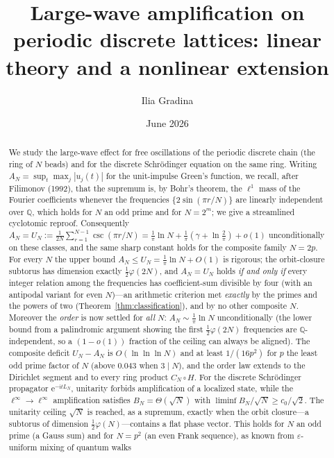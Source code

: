 \documentclass[11pt,reqno]{amsart}
\theoremstyle{plain}
\theoremstyle{definition}
\newcommand{\Q}{\mathbb{Q}}
\newcommand{\LN}{L_N}
\newcommand{\eu}{\mathrm{e}}
\begin{document}
\title[Large-wave amplification on discrete lattices]{Large-wave amplification on periodic discrete lattices: linear theory and a nonlinear extension}
\author{Ilia Gradina}
\date{June 2026}

\begin{abstract}
We study the large-wave effect for free oscillations of the periodic discrete chain
(the ring of $N$ beads) and for the discrete Schr\"odinger equation on the same ring.
Writing $A_N=\sup_{t}\max_j|u_j(t)|$ for the unit-impulse Green's function, we recall, after
Filimonov (1992), that the supremum is, by Bohr's theorem, the $\ell^1$ mass of the Fourier coefficients
whenever the frequencies $\{2\sin(\pi r/N)\}$ are linearly independent over $\Q$, which holds for $N$ an odd
prime and for $N=2^m$; we give a streamlined cyclotomic reproof. Consequently
$A_N=U_N:=\tfrac1{2N}\sum_{r=1}^{N-1}\csc(\pi r/N)=\tfrac1\pi\ln N+\tfrac1\pi(\gamma+\ln\tfrac2\pi)+o(1)$
unconditionally on these classes, and the same sharp constant holds for the composite family $N=2p$.
For every $N$ the upper bound $A_N\le U_N=\tfrac1\pi\ln N+O(1)$ is rigorous; the orbit-closure subtorus
has dimension exactly $\tfrac12\varphi(2N)$, and $A_N=U_N$ holds \emph{if and only if} every integer
relation among the frequencies has coefficient-sum divisible by four (with an antipodal variant for even
$N$)---an arithmetic criterion met \emph{exactly} by the primes and the powers of two
(Theorem~\ref{thm:classification}), and by no other composite $N$. Moreover the \emph{order} is now settled for
\emph{all} $N$: $A_N\sim\tfrac1\pi\ln N$ unconditionally (the lower bound from a palindromic argument
showing the first $\tfrac12\varphi(2N)$ frequencies are $\Q$-independent, so a $(1-o(1))$ fraction of the
ceiling can always be aligned). The composite deficit $U_N-A_N$ is $O(\ln\ln\ln N)$ and at least $1/(16p^2)$ for
$p$ the least odd prime factor of $N$ (above $0.043$ when $3\mid N$), and the order law extends to the Dirichlet segment
and to every ring product $C_N\,\square\,H$. For the discrete Schr\"odinger propagator
$\eu^{-\mathrm{i}t\LN}$, unitarity forbids amplification of a localized state, while the
$\ell^\infty\!\to\!\ell^\infty$ amplification satisfies $B_N=\Theta(\sqrt N)$ with $\liminf B_N/\sqrt N\ge
c_0/\sqrt2$. The unitarity ceiling $\sqrt N$ is reached, as a supremum, exactly when the orbit closure---a
subtorus of dimension $\tfrac12\varphi(N)$---contains a flat phase vector. This holds for $N$ an odd prime
(a Gauss sum) and for $N=p^2$ (an even Frank sequence), as known from $\varepsilon$-uniform mixing of quantum walks

\end{abstract}
\end{document}
